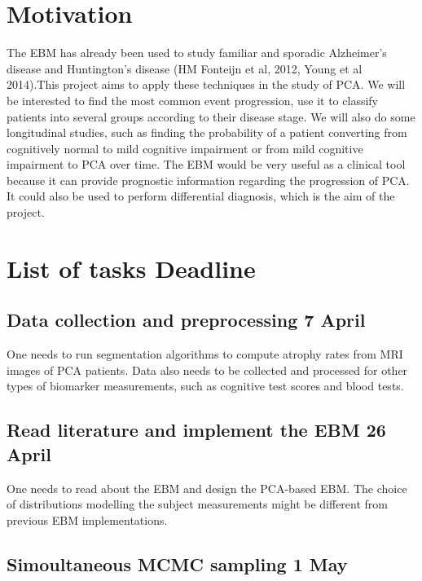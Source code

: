 \documentclass[12pt,a4paper,oneside]{report}
\begin{document}
\section*{Motivation}

The EBM has already been used to study familiar and sporadic Alzheimer's disease and Huntington's disease (HM Fonteijn et al, 2012, Young et al 2014).This project aims to apply these techniques in the study of PCA. We will be interested to find the most common event progression, use it to classify patients into several groups according to their disease stage. We will also do some longitudinal studies, such as finding the probability of a patient converting from cognitively normal to mild cognitive impairment or from mild cognitive impairment to PCA over time. The EBM would be very useful as a clinical tool because it can provide prognostic information regarding the progression of PCA. It could also be used to perform differential diagnosis, which is the aim of the project.


\section*{List of tasks \hfill Deadline}

\renewcommand\arraystretch{4.4} %
\newcommand\taskHeader[1]{\Large{\textbf{#1}}}

\subsection*{\noindent Data collection and preprocessing \hfill 7 April}

One needs to run segmentation algorithms to compute atrophy rates from MRI images of PCA patients. Data also needs to be collected and processed for other types of biomarker measurements, such as cognitive test scores and blood tests.

\subsection*{\noindent Read literature and implement the EBM \hfill 26 April}

One needs to read about the EBM and design the PCA-based EBM. The choice of distributions modelling the subject measurements might be different from previous EBM implementations.

\subsection*{\noindent Simoultaneous MCMC sampling \hfill 1 May}
\end{document}
